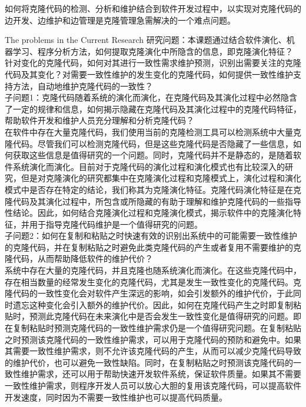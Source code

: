 如何将克隆代码的检测、分析和维护结合到软件开发过程中，以实现对克隆代码的边开发、边维护和边管理是克隆管理急需解决的一个难点问题。

{The problems in the Current Research}
研究问题：本课题通过结合软件演化、机器学习、程序分析方法，如何提取克隆演化中所隐含的信息，即克隆演化特征？ 针对变化的克隆代码，如何对其进行一致性需求维护预测，识别出需要关注的克隆代码及其变化？对需要一致性维护的发生变化的克隆代码，如何提供一致性维护支持方法，自动地维护克隆代码的一致性？\\

子问题1：克隆代码随着系统的演化而演化，在克隆代码及其演化过程中必然隐含了一定的规律和信息，如何揭示隐藏在克隆代码及其演化过程中的克隆代码特征，帮助软件开发和维护人员充分理解和分析克隆代码？ \\

在软件中存在大量克隆代码，我们使用当前的克隆检测工具可以检测系统中大量克隆代码。尽管我们可以检测克隆代码，但是这些克隆代码是否隐藏了一些信息，如何获取这些信息是值得研究的一个问题。同时，克隆代码并不是静态的，是随着软件系统演化而演化。目前对于克隆代码的演化过程和演化模式也有比较深入的研究，但是对克隆演化的研究都集中在克隆演化过程和克隆模式上，演化过程和演化模式中是否存在特定的结论，我们称其为克隆演化特征。克隆代码演化特征是在克隆代码及其演化过程中，所包含或所隐藏的有助于理解和维护克隆代码的一些指导性结论。因此，如何结合克隆演化过程和克隆演化模式，揭示软件中的克隆演化特征，并用于指导克隆代码维护是一个值得研究的问题。\\

子问题2：如何在复制和粘贴之时快速有效的识别出系统中的可能需要一致性维护的克隆代码，并在复制粘贴之时避免此类克隆代码的产生或者复用不需要维护的克隆代码，从而帮助降低软件的维护代价？\\

系统中存在大量的克隆代码，并且克隆也随系统演化而演化。在这些克隆代码中，存在相当数量的经常发生变化的克隆代码，尤其是发生一致性变化的克隆代码。克隆代码的一致性变化会对软件产生深远的影响，如会引发额外的维护代价，于此同时遗忘这种变化会引入额外的维护代价。因此，如何在克隆代码产生之时即复制粘贴时，预测此克隆代码在未来演化中是否会发生一致性变化是值得研究的问题。即在复制粘贴时预测克隆代码的一致性维护需求仍是一个值得研究问题。在复制粘贴之时预测该克隆代码的一致性维护需求，可以用于克隆代码的预防和避免中。如果其需要一致性维护需求，则不允许该克隆代码的产生，从而可以减少克隆代码导致的维护代价，也可以避免一致性缺陷。同时，在复制粘贴之时预测该克隆代码的一致性维护需求，还可以用于帮助快速开发软件系统，保证软件质量。如果其不需要一致性维护需求，则程序开发人员可以放心大胆的复用该克隆代码，可以提高软件开发速度，同时因为不需要一致性维护也可以提高代码质量。\\

